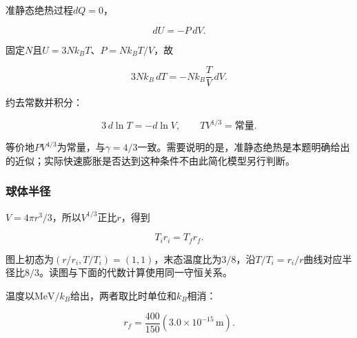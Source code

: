 \documentclass[12pt,a4paper,fontset=fandol]{ctexart}
\begin{document}
准静态绝热过程\(dQ=0\)，

\[
dU=-P\,dV.
\]

固定\(N\)且\(U=3Nk_BT\)、\(P=Nk_BT/V\)，故

\[
3Nk_B\,dT=-Nk_B\frac{T}{V}\,dV.
\]

约去常数并积分：

\[
3\,d\ln T=-d\ln V,
\qquad
\boxed{TV^{1/3}=\text{常量}}.
\]

等价地\(PV^{4/3}\)为常量，与\(\gamma=4/3\)一致。需要说明的是，准静态绝热是本题明确给出的近似；实际快速膨胀是否达到这种条件不由此简化模型另行判断。

\subsubsection{球体半径}\label{ux7403ux4f53ux534aux5f84}

\(V=4\pi r^3/3\)，所以\(V^{1/3}\)正比\(r\)，得到

\[
T_ir_i=T_fr_f.
\]

\begin{center}
\begin{minipage}{\linewidth}
\centering\begingroup{}
\ifdim\wd\diagrambox>.88\linewidth
\sbox{\diagrambox}{\resizebox{.88\linewidth}{!}{\usebox{\diagrambox}}}\fi
\ifdim\ht\diagrambox>.38\textheight
\resizebox{!}{.38\textheight}{\usebox{\diagrambox}}
\else\usebox{\diagrambox}\fi
\par{}\endgroup\end{minipage}\end{center}

图上初态为\((r/r_i,T/T_i)=(1,1)\)，末态温度比为\(3/8\)，沿\(T/T_i=r_i/r\)曲线对应半径比\(8/3\)。读图与下面的代数计算使用同一守恒关系。

温度以\(\mathrm{MeV}/k_B\)给出，两者取比时单位和\(k_B\)相消：

\[
r_f=\frac{400}{150}
\left(3.0\times10^{-15}\,\mathrm m\right).
\]
\end{document}
